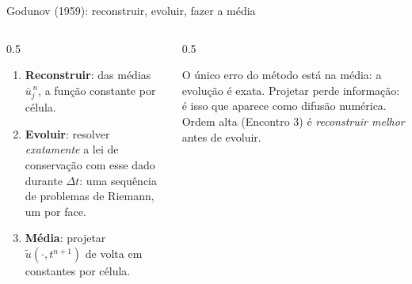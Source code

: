 \documentclass[aspectratio=169,10pt]{beamer}
\newcommand{\ub}{\bar u}
\begin{document}
\begin{frame}{Godunov (1959): reconstruir, evoluir, fazer a média}
\begin{columns}[T]
\begin{column}{0.5\textwidth}
\begin{enumerate}
\item \textbf{Reconstruir}: das médias $\ub_j^{\,n}$, a função constante por célula.
\item \textbf{Evoluir}: resolver \emph{exatamente} a lei de conservação com esse dado durante $\Delta t$: uma sequência de problemas de Riemann, um por face.
\item \textbf{Média}: projetar $\tilde u(\cdot,t^{n+1})$ de volta em constantes por célula.
\end{enumerate}
\end{column}
\begin{column}{0.5\textwidth}
\begin{intuicao}
O único erro do método está na média: a evolução é exata. Projetar perde informação: é isso que aparece como difusão numérica. Ordem alta (Encontro 3) é \emph{reconstruir melhor} antes de evoluir.
\end{intuicao}
\end{column}
\end{columns}
\end{frame}
\end{document}
